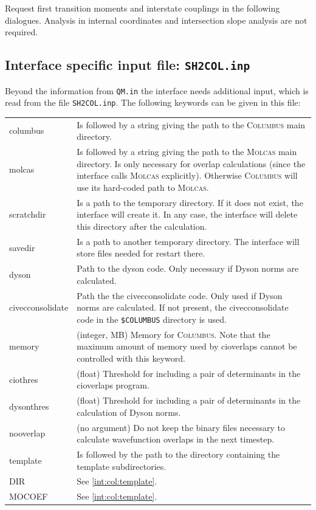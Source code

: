 \documentclass[a4paper,11pt,DIV=15,openany,twoside=false]{scrbook}
\newcommand{\ttt}[1]{\texttt{#1}}
\begin{document}
Request first transition moments and interstate couplings in the following dialogues. Analysis in internal coordinates and intersection slope analysis are not required.

\subsection{Interface specific input file: \ttt{SH2COL.inp}}

Beyond the information from \ttt{QM.in} the interface needs additional input, which is read from the file \ttt{SH2COL.inp}. The following keywords can be given in this file:

\begin{tabular}{lp{9cm}}
columbus        &Is followed by a string giving the path to the \textsc{Columbus} main directory.\\
molcas          &Is followed by a string giving the path to the \textsc{Molcas} main directory. Is only necessary for overlap calculations (since the interface calls \textsc{Molcas} explicitly). Otherwise \textsc{Columbus} will use its hard-coded path to \textsc{Molcas}.\\
scratchdir      &Is a path to the temporary directory. If it does not exist, the interface will create it. In any case, the interface will delete this directory after the calculation.\\
savedir         &Is a path to another temporary directory. The interface will store files needed for restart there.\\
dyson           &Path to the dyson code. Only necessary if Dyson norms are calculated.\\
civecconsolidate&Path the the civecconsolidate code. Only used if Dyson norms are calculated. If not present, the civecconsolidate code in the \ttt{\$COLUMBUS} directory is used.\\
memory          &(integer, MB) Memory for \textsc{Columbus}. Note that the maximum amount of memory used by cioverlaps cannot be controlled with this keyword.\\
ciothres        &(float) Threshold for including a pair of determinants in the cioverlaps program.\\
dysonthres      &(float) Threshold for including a pair of determinants in the calculation of Dyson norms.\\
nooverlap       &(no argument) Do not keep the binary files necessary to calculate wavefunction overlaps in the next timestep.\\
template        &Is followed by the path to the directory containing the template subdirectories.\\
DIR             &See \ref{int:col:template}.\\
MOCOEF          &See \ref{int:col:template}.\\
\end{tabular}
\end{document}
